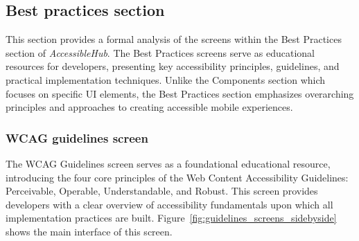 \subsection{Best practices section}
\label{subsec:best-practices-section}

This section provides a formal analysis of the screens within the Best Practices section of \textit{AccessibleHub}. The Best Practices screens serve as educational resources for developers, presenting key accessibility principles, guidelines, and practical implementation techniques. Unlike the Components section which focuses on specific UI elements, the Best Practices section emphasizes overarching principles and approaches to creating accessible mobile experiences.

\subsubsection{WCAG guidelines screen}
\label{subsubsec:guidelines-screen}

The WCAG Guidelines screen serves as a foundational educational resource, introducing the four core principles of the Web Content Accessibility Guidelines: Perceivable, Operable, Understandable, and Robust. This screen provides developers with a clear overview of accessibility fundamentals upon which all implementation practices are built. Figure~\ref{fig:guidelines_screens_sidebyside} shows the main interface of this screen.

\pagebreak

